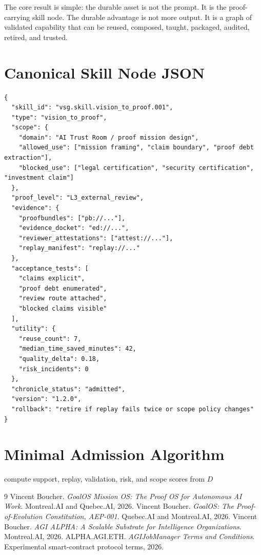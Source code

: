 \documentclass[10.5pt]{article}
\theoremstyle{goThm}
\begin{document}
The core result is simple: the durable asset is not the prompt. It is the proof-carrying skill node. The durable advantage is not more output. It is a graph of validated capability that can be reused, composed, taught, packaged, audited, retired, and trusted.

\appendix
\section{Canonical Skill Node JSON}
\begin{verbatim}
{
  "skill_id": "vsg.skill.vision_to_proof.001",
  "type": "vision_to_proof",
  "scope": {
    "domain": "AI Trust Room / proof mission design",
    "allowed_use": ["mission framing", "claim boundary", "proof debt extraction"],
    "blocked_use": ["legal certification", "security certification", "investment claim"]
  },
  "proof_level": "L3_external_review",
  "evidence": {
    "proofbundles": ["pb://..."],
    "evidence_docket": "ed://...",
    "reviewer_attestations": ["attest://..."],
    "replay_manifest": "replay://..."
  },
  "acceptance_tests": [
    "claims explicit",
    "proof debt enumerated",
    "review route attached",
    "blocked claims visible"
  ],
  "utility": {
    "reuse_count": 7,
    "median_time_saved_minutes": 42,
    "quality_delta": 0.18,
    "risk_incidents": 0
  },
  "chronicle_status": "admitted",
  "version": "1.2.0",
  "rollback": "retire if replay fails twice or scope policy changes"
}
\end{verbatim}

\section{Minimal Admission Algorithm}
\begin{algorithm}[H]
\DontPrintSemicolon
{}
compute support, replay, validation, risk, and scope scores from $D$\;
\;
\caption{Chronicle admission decision.}
\end{algorithm}

\begin{thebibliography}{9}
 Vincent Boucher. \emph{GoalOS Mission OS: The Proof OS for Autonomous AI Work}. Montreal.AI and Quebec.AI, 2026.
 Vincent Boucher. \emph{GoalOS: The Proof-of-Evolution Constitution, AEP-001}. Quebec.AI and Montreal.AI, 2026.
 Vincent Boucher. \emph{AGI ALPHA: A Scalable Substrate for Intelligence Organizations}. Montreal.AI, 2026.
 ALPHA.AGI.ETH. \emph{AGIJobManager Terms and Conditions}. Experimental smart-contract protocol terms, 2026.
\end{thebibliography}
\end{document}
